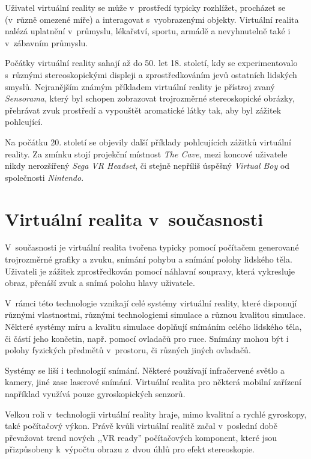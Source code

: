 Uživatel virtuální reality se může v~prostředí typicky rozhlížet,
procházet se (v~různě omezené míře) a interagovat s~vyobrazenými
objekty. Virtuální realita nalézá uplatnění v~průmyslu, lékařství,
sportu, armádě a nevyhnutelně také i v~zábavním průmyslu. \autocite{vrusage}

Počátky virtuální reality sahají až do 50. let 18. století, kdy se
experimentovalo s~různými stereoskopickými displeji a zprostředkováním
jevů ostatních lidských smyslů. Nejranějším známým příkladem virtuální
reality je přístroj zvaný \emph{Sensorama}, který byl schopen zobrazovat
trojrozměrné stereoskopické obrázky, přehrávat zvuk prostředí a
vypouštět aromatické látky tak, aby byl zážitek pohlcující. \autocite{oldvr}

Na počátku 20. století se objevily další příklady pohlcujících zážitků
virtuální reality. Za zmínku stojí projekční místnost \emph{The Cave},
mezi koncové uživatele nikdy nerozšířený \emph{Sega VR Headset}, či
stejně nepříliš úspěšný \emph{Virtual Boy} od společnosti
\emph{Nintendo}.

\section{Virtuální realita
v~současnosti}\label{virtuuxe1lnuxed-realita-v-souux10dasnosti}

V~současnosti je virtuální realita tvořena typicky pomocí počítačem
generované trojrozměrné grafiky a zvuku, snímání pohybu a snímání polohy
lidského těla. Uživateli je zážitek zprostředkován pomocí náhlavní
soupravy, která vykresluje obraz, přenáší zvuk a snímá polohu hlavy
uživatele.

V~rámci této technologie vznikají celé systémy virtuální reality,
které disponují různými vlastnostmi, různými technologiemi simulace a
různou kvalitou simulace. Některé systémy míru a kvalitu simulace
doplňují snímáním celého lidského těla, či částí jeho končetin, např.
pomocí ovladačů pro ruce. Snímány mohou být i polohy fyzických předmětů v~prostoru, či
různých jiných ovladačů. 

Systémy se liší i technologií snímání.
Některé používají infračervené světlo a kamery, jiné zase laserové
snímání. Virtuální realita pro některá mobilní zařízení například
využívá pouze gyroskopických senzorů.

Velkou roli v~technologii virtuální reality hraje, mimo kvalitní a rychlé gyroskopy,
také počítačový výkon. Právě kvůli virtuální realitě začal v~poslední
době převažovat trend nových ,,VR ready'' počítačových komponent, které jsou
přizpůsobeny k~výpočtu obrazu z~dvou úhlů pro efekt stereoskopie. \autocite{vrtech}

